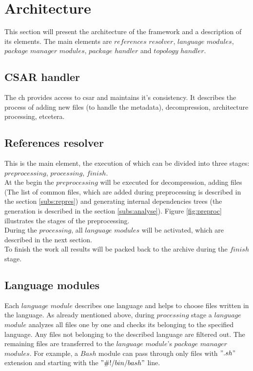 \section{Architecture}\label{sec:arch}
This section will present the architecture of the framework and a description of its elements.
The main elements are $references$ $resolver$, $language$ $modules$, $package$ $manager$ $modules$, $package$ $handler$ and $topology$ $handler$.

\subsection{CSAR handler} \label{subs:casr_h}
The \gls{ch} provides access to \gls{csar} and maintains it's consistency. 
It describes the process of adding new files (to handle the metadata), decompression, architecture processing, etcetera.

\subsection{References resolver} \label{subs:RR}
This is the main element, the execution of which can be divided into three stages: $preprocessing$, $processing$, $finish$. \\
At the begin the $preprocessing$ will be executed for decompression, adding files (The list of common files, which are added during preprocessing is described in the section \ref{subs:repres}) and generating internal dependencies trees (the generation is described in the section \ref{subs:analyse}).
Figure \ref{fig:preproc} illustrates the stages of the preprocessing.\\

During the $processing$, all $language$ $modules$ will be activated, which are described in the next section. \\
To finish the work  all results will be packed back to the archive during the $finish$ stage.
\subsection{Language modules} \label{subs:archlm}
Each $language$ $module$ describes one language and helps to choose files written in the language.
As already mentioned above, during $processing$ stage a $language$ $module$ analyzes all files one by one and checks its belonging to the specified language. 
Any files not belonging to the described language are filtered out.
The remaining files are transferred to the $language$ $module$'s $package$ $manager$ $modules$.
For example, a $Bash$ module can pass through only files with $".sh"$ extension and starting with the $"\#!/bin/bash"$ line.

